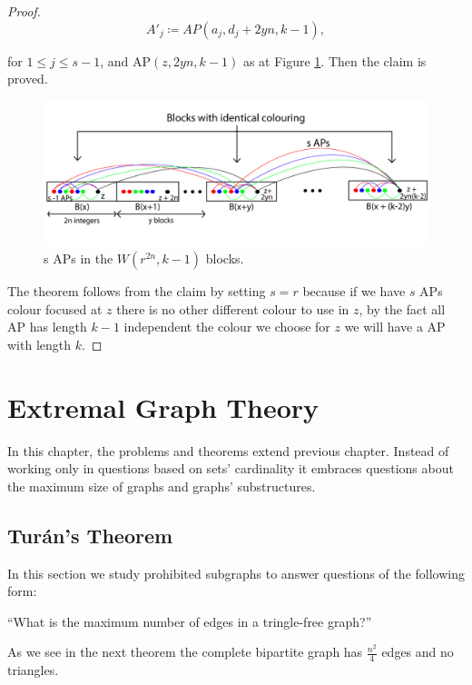 \documentclass[12pt,twoside,a4paper]{book}
\numberwithin{equation}{section}
\theoremstyle{remark}
\begin{document}
\begin{proof}
$$ A'_j \coloneqq AP(a_j, d_j + 2yn, k-1) , $$

for $1 \leq j \leq s-1$, and AP$(z, 2yn, k-1)$ as at Figure \ref{fig:VanderWaerdenBlocks}. Then the claim is proved.

\begin{figure}[H]
     \centering
     \includegraphics[scale=1.8]{Figuras/Van-der-Waerden-Blocks.jpg}
     \caption{s APs in the $W(r^{2n},k-1)$ blocks.}
     \label{fig:VanderWaerdenBlocks}
\end{figure}

The theorem follows from the claim by setting $s=r$ because if we have $s$  APs colour focused at $z$ there is no other different colour to use in $z$, by the fact all AP has length $k-1$  independent the colour we choose for $z$ we will have a AP with length $k$.

\end{proof}



\chapter{Extremal Graph Theory}
In this chapter, the problems and theorems extend previous chapter. Instead of working only in questions based on sets' cardinality it embraces questions about the maximum size of graphs and graphs' substructures.
\section{Turán's Theorem}
In this section we study prohibited subgraphs to answer questions of the following form: 
\begin{center}``What is the maximum number of edges in a tringle-free graph?''\end{center}
As we see in the next theorem the complete bipartite graph has $\frac{n^{2}}{4}$ edges and no triangles.\\
\end{document}
